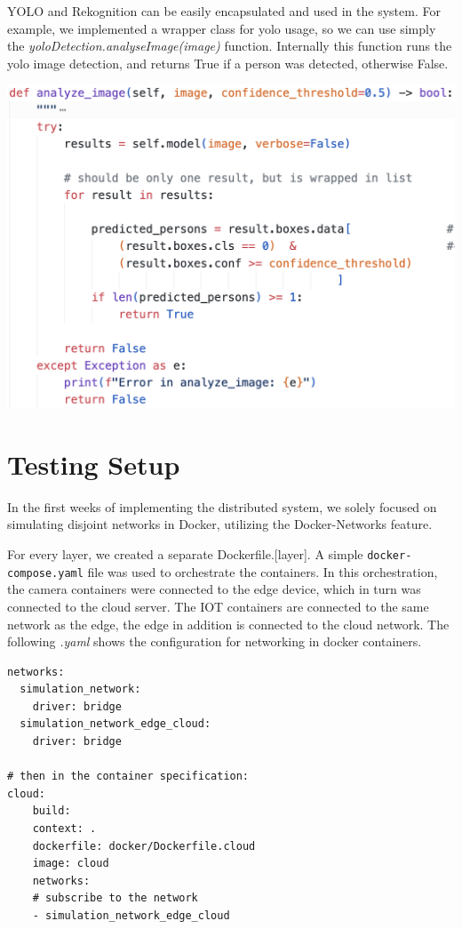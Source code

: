 \documentclass[conference]{IEEEtran}
\begin{document}
YOLO and Rekognition can be easily encapsulated and used in the system. 
For example, we implemented a wrapper class for yolo usage, so we can use simply the \textit{yoloDetection.analyseImage(image)} function. 
Internally this function runs the yolo image detection, and returns True if a person was detected, otherwise False. 

\begin{center}
\includegraphics[width=1\linewidth]{analyze_image-function.png}
\end{center}

\section{Testing Setup}
In the first weeks of implementing the distributed system, we solely focused on simulating disjoint networks in Docker, utilizing the Docker-Networks feature. 

For every layer, we created a separate Dockerfile.[layer]. A simple \texttt{docker-compose.yaml} file was used to orchestrate the containers. In this orchestration, the camera containers were connected to the edge device, which in turn was connected to the cloud server. 
The IOT containers are connected to the same network as the edge, the edge in addition is connected to the cloud network. 
The following \textit{.yaml} shows the configuration for networking in docker containers.

\begin{verbatim}
networks:
  simulation_network:
    driver: bridge
  simulation_network_edge_cloud:
    driver: bridge

# then in the container specification: 
cloud: 
    build:
    context: .
    dockerfile: docker/Dockerfile.cloud
    image: cloud
    networks:
    # subscribe to the network
    - simulation_network_edge_cloud 
\end{verbatim}
\end{document}
